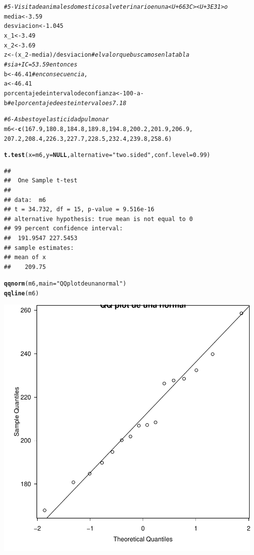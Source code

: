 \documentclass{article}\usepackage[]{graphicx}\usepackage[]{color}
\makeatletter
\newcommand{\hlnum}[1]{\textcolor[rgb]{0.686,0.059,0.569}{#1}}%
\newcommand{\hlstr}[1]{\textcolor[rgb]{0.192,0.494,0.8}{#1}}%
\newcommand{\hlcom}[1]{\textcolor[rgb]{0.678,0.584,0.686}{\textit{#1}}}%
\newcommand{\hlopt}[1]{\textcolor[rgb]{0,0,0}{#1}}%
\newcommand{\hlstd}[1]{\textcolor[rgb]{0.345,0.345,0.345}{#1}}%
\newcommand{\hlkwa}[1]{\textcolor[rgb]{0.161,0.373,0.58}{\textbf{#1}}}%
\newcommand{\hlkwb}[1]{\textcolor[rgb]{0.69,0.353,0.396}{#1}}%
\newcommand{\hlkwc}[1]{\textcolor[rgb]{0.333,0.667,0.333}{#1}}%
\newcommand{\hlkwd}[1]{\textcolor[rgb]{0.737,0.353,0.396}{\textbf{#1}}}%
\newenvironment{kframe}{%
 \def\at@end@of@kframe{}%
 \ifinner\ifhmode%
  \def\at@end@of@kframe{\end{minipage}}%
  \begin{minipage}{\columnwidth}%
 \fi\fi%
 \def\FrameCommand##1{\hskip\@totalleftmargin \hskip-\fboxsep
 \colorbox{shadecolor}{##1}\hskip-\fboxsep
     \hskip-\linewidth \hskip-\@totalleftmargin \hskip\columnwidth}%
 \MakeFramed {\advance\hsize-\width
   \@totalleftmargin\z@ \linewidth\hsize
   \@setminipage}}%
 {\par\unskip\endMakeFramed%
 \at@end@of@kframe}
\newenvironment{knitrout}{}{} %
\makeatother
\begin{document}
\begin{knitrout}
\begin{kframe}
\begin{alltt}
\hlcom{# 5 - Visita de animales domesticos al veterinario en un a<U+663C><U+3E31>o}
\hlstd{media}\hlkwb{<-}\hlnum{3.59}
\hlstd{desviacion}\hlkwb{<-}\hlnum{1.045}
\hlstd{x_1}\hlkwb{<-}\hlnum{3.49}
\hlstd{x_2}\hlkwb{<-}\hlnum{3.69}
\hlstd{z}\hlkwb{<-}\hlstd{(x_2}\hlopt{-}\hlstd{media)}\hlopt{/}\hlstd{desviacion} \hlcom{# el valor que buscamos en la tabla }
  \hlcom{# si a+IC=53.59 entonces }
  \hlstd{b}\hlkwb{<-}\hlnum{46.41} \hlcom{# en consecuencia,}
  \hlstd{a}\hlkwb{<-}\hlnum{46.41}
\hlstd{porcentajedeintervalodeconfianza}\hlkwb{<-}\hlnum{100}\hlopt{-}\hlstd{a}\hlopt{-}\hlstd{b} \hlcom{# el porcentaje de este intervalo es 7.18}


\hlcom{# 6 - Asbesto y elasticidad pulmonar}
\hlstd{m6} \hlkwb{<-} \hlkwd{c}\hlstd{(}\hlnum{167.9}\hlstd{,} \hlnum{180.8}\hlstd{,} \hlnum{184.8}\hlstd{,} \hlnum{189.8}\hlstd{,} \hlnum{194.8}\hlstd{,} \hlnum{200.2}\hlstd{,} \hlnum{201.9}\hlstd{,} \hlnum{206.9}\hlstd{,}
        \hlnum{207.2}\hlstd{,} \hlnum{208.4}\hlstd{,} \hlnum{226.3}\hlstd{,} \hlnum{227.7}\hlstd{,} \hlnum{228.5}\hlstd{,} \hlnum{232.4}\hlstd{,} \hlnum{239.8}\hlstd{,} \hlnum{258.6}\hlstd{)}

\hlkwd{t.test}\hlstd{(}\hlkwc{x} \hlstd{= m6,} \hlkwc{y} \hlstd{=} \hlkwa{NULL}\hlstd{,}\hlkwc{alternative} \hlstd{=} \hlstr{"two.sided"}\hlstd{,} \hlkwc{conf.level} \hlstd{=} \hlnum{0.99}\hlstd{)}
\end{alltt}
\begin{verbatim}
## 
## 	One Sample t-test
## 
## data:  m6
## t = 34.732, df = 15, p-value = 9.516e-16
## alternative hypothesis: true mean is not equal to 0
## 99 percent confidence interval:
##  191.9547 227.5453
## sample estimates:
## mean of x 
##    209.75
\end{verbatim}
\begin{alltt}
\hlkwd{qqnorm}\hlstd{(m6,} \hlkwc{main}\hlstd{=}\hlstr{"QQ plot de una normal"}\hlstd{)}
\hlkwd{qqline}\hlstd{(m6)}
\end{alltt}
\end{kframe}

{\centering \includegraphics[width=.6\linewidth]{figure/Parcial-3-Rnwauto-report-2} 

}
\end{knitrout}
\end{document}
